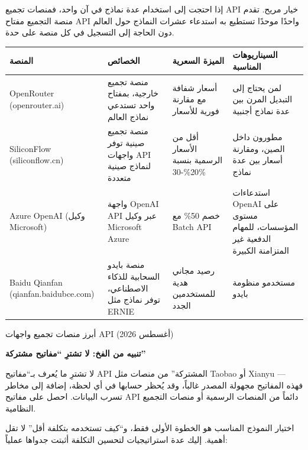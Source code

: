 
إذا احتجت إلى استخدام عدة نماذج في آن واحد، فمنصات تجميع API خيار مريح. تقدم منصة التجميع مفتاح API واحدًا موحدًا تستطيع به استدعاء عشرات النماذج حول العالم دون الحاجة إلى التسجيل في كل منصة على حدة.

\begin{center}
\begin{tabularx}{\linewidth}{|X|X|X|X|}
\hline
\textbf{المنصة} & \textbf{الخصائص} & \textbf{الميزة السعرية} & \textbf{السيناريوهات المناسبة} \tabularnewline
\hline
OpenRouter (openrouter.ai) & منصة تجميع خارجية، بمفتاح واحد تستدعي نماذج العالم & أسعار شفافة مع مقارنة فورية للأسعار & لمن يحتاج إلى التبديل المرن بين عدة نماذج أجنبية \tabularnewline
SiliconFlow (siliconflow.cn) & منصة تجميع صينية توفر واجهات API لنماذج صينية متعددة & أقل من الأسعار الرسمية بنسبة 20\%-30\% & مطورون داخل الصين، ومقارنة أسعار بين عدة نماذج \tabularnewline
Azure OpenAI (وكيل Microsoft) & واجهة OpenAI API عبر وكيل Microsoft Azure & خصم 50\% مع Batch API & استدعاءات OpenAI على مستوى المؤسسات، للمهام الدفعية غير المتزامنة الكبيرة \tabularnewline
Baidu Qianfan (qianfan.baidubce.com) & منصة بايدو السحابية للذكاء الاصطناعي، توفر نماذج مثل ERNIE & رصيد مجاني هدية للمستخدمين الجدد & مستخدمو منظومة بايدو \tabularnewline
\hline
\end{tabularx}
\end{center}

\begin{center}\small\color{gray}أبرز منصات تجميع واجهات API (أغسطس 2026)\end{center}

\textbf{تنبيه من الفخ: لا تشترِ “مفاتيح مشتركة”}\par

لا تشترِ ما يُعرف بـ“مفاتيح API المشتركة” من منصات مثل Taobao أو Xianyu — فهذه المفاتيح مجهولة المصدر غالباً، وقد يُحظر حسابها في أي لحظة، إضافة إلى مخاطر تسرب البيانات. احصل على مفاتيح API دائماً من المنصات الرسمية أو منصات التجميع النظامية.


اختيار النموذج المناسب هو الخطوة الأولى فقط، و“كيف تستخدمه بتكلفة أقل” لا تقل أهمية. إليك عدة استراتيجيات لتحسين التكلفة أثبتت جدواها عملياً:

